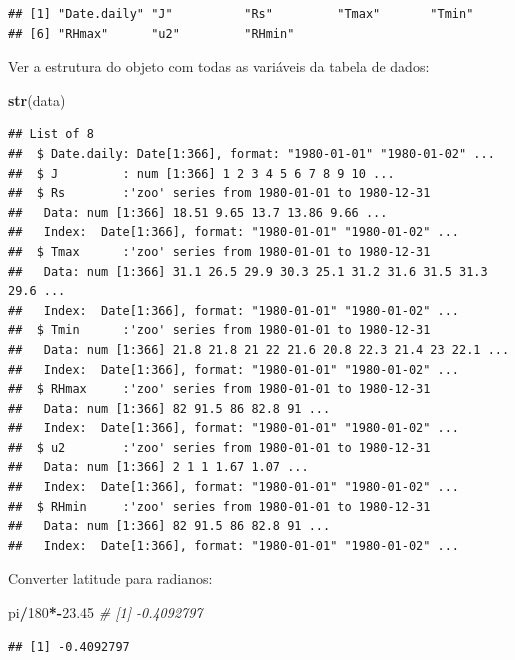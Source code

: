 \documentclass[
]{book}
\newenvironment{Shaded}{\begin{snugshade}}{\end{snugshade}}
\newcommand{\CommentTok}[1]{\textcolor[rgb]{0.56,0.35,0.01}{\textit{#1}}}
\newcommand{\DecValTok}[1]{\textcolor[rgb]{0.00,0.00,0.81}{#1}}
\newcommand{\FloatTok}[1]{\textcolor[rgb]{0.00,0.00,0.81}{#1}}
\newcommand{\KeywordTok}[1]{\textcolor[rgb]{0.13,0.29,0.53}{\textbf{#1}}}
\newcommand{\NormalTok}[1]{#1}
\newcommand{\OperatorTok}[1]{\textcolor[rgb]{0.81,0.36,0.00}{\textbf{#1}}}
\begin{document}
\begin{verbatim}
## [1] "Date.daily" "J"          "Rs"         "Tmax"       "Tmin"      
## [6] "RHmax"      "u2"         "RHmin"
\end{verbatim}

Ver a estrutura do objeto com todas as variáveis da tabela de dados:

\begin{Shaded}
\begin{Highlighting}[]
\KeywordTok{str}\NormalTok{(data)}
\end{Highlighting}
\end{Shaded}

\begin{verbatim}
## List of 8
##  $ Date.daily: Date[1:366], format: "1980-01-01" "1980-01-02" ...
##  $ J         : num [1:366] 1 2 3 4 5 6 7 8 9 10 ...
##  $ Rs        :'zoo' series from 1980-01-01 to 1980-12-31
##   Data: num [1:366] 18.51 9.65 13.7 13.86 9.66 ...
##   Index:  Date[1:366], format: "1980-01-01" "1980-01-02" ...
##  $ Tmax      :'zoo' series from 1980-01-01 to 1980-12-31
##   Data: num [1:366] 31.1 26.5 29.9 30.3 25.1 31.2 31.6 31.5 31.3 29.6 ...
##   Index:  Date[1:366], format: "1980-01-01" "1980-01-02" ...
##  $ Tmin      :'zoo' series from 1980-01-01 to 1980-12-31
##   Data: num [1:366] 21.8 21.8 21 22 21.6 20.8 22.3 21.4 23 22.1 ...
##   Index:  Date[1:366], format: "1980-01-01" "1980-01-02" ...
##  $ RHmax     :'zoo' series from 1980-01-01 to 1980-12-31
##   Data: num [1:366] 82 91.5 86 82.8 91 ...
##   Index:  Date[1:366], format: "1980-01-01" "1980-01-02" ...
##  $ u2        :'zoo' series from 1980-01-01 to 1980-12-31
##   Data: num [1:366] 2 1 1 1.67 1.07 ...
##   Index:  Date[1:366], format: "1980-01-01" "1980-01-02" ...
##  $ RHmin     :'zoo' series from 1980-01-01 to 1980-12-31
##   Data: num [1:366] 82 91.5 86 82.8 91 ...
##   Index:  Date[1:366], format: "1980-01-01" "1980-01-02" ...
\end{verbatim}

Converter latitude para radianos:

\begin{Shaded}
\begin{Highlighting}[]
\NormalTok{pi}\OperatorTok{/}\DecValTok{180}\OperatorTok{*-}\FloatTok{23.45} \CommentTok{# [1] -0.4092797}
\end{Highlighting}
\end{Shaded}

\begin{verbatim}
## [1] -0.4092797
\end{verbatim}
\end{document}
